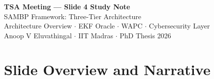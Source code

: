 \documentclass[12pt,a4paper]{article}
\begin{document}
\begin{tcolorbox}[colback=iitmnavy,coltext=white,arc=4pt,boxrule=0pt]
\begin{center}
  {\Large\bfseries TSA Meeting --- Slide 4 Study Note}\\[4pt]
  {\large SAMBP Framework: Three-Tier Architecture}\\[6pt]
  {\normalsize Architecture Overview $\cdot$ EKF Oracle $\cdot$ WAPC $\cdot$ Cybersecurity Layer}\\[2pt]
  {\small Anoop V Eluvathingal $\cdot$ IIT Madras $\cdot$ PhD Thesis 2026}
\end{center}
\end{tcolorbox}

\vspace{6pt}

\section{Slide Overview and Narrative}
\end{document}
